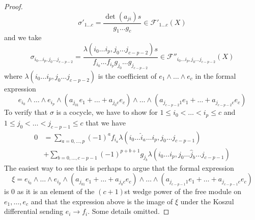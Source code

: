 \documentclass{stacks-project}
\theoremstyle{plain}
\theoremstyle{definition}
\theoremstyle{remark}
\numberwithin{equation}{subsection}
\begin{document}
\begin{proof}
$$\sigma'_{1 \ldots c} = \frac{\det(a_{ji})s}{g_1 \ldots g_c} \in
\mathcal{F}'_{1 \ldots c}(X)
$$
and we take
$$
\sigma_{i_0 \ldots i_p, j_0 \ldots j_{c - p - 2}} =
\frac{\lambda(i_0 \ldots i_p, j_0 \ldots j_{c - p - 2})s}%
{f_{i_0} \ldots f_{i_p}g_{j_0} \ldots g_{j_{c - p - 2}}}
\in \mathcal{F}''_{i_0 \ldots i_p, j_0 \ldots j_{c - p - 2}}(X)
$$
where $\lambda(i_0 \ldots i_p, j_0 \ldots j_{c - p - 2})$
is the coefficient of $e_1 \wedge \ldots \wedge e_c$ in
the formal expression
$$
e_{i_0} \wedge \ldots \wedge e_{i_p} \wedge
(a_{j_01} e_1 + \ldots + a_{j_0c}e_c) \wedge \ldots \wedge
(a_{j_{c - p - 2}1} e_1 + \ldots + a_{j_{c - p - 2}c}e_c)
$$
To verify that $\sigma$ is a cocycle, we have to show for
$1 \leq i_0 < \ldots < i_p \leq c$ and
$1 \leq j_0 < \ldots < j_{c - p - 1} \leq c$
that we have
\begin{align*}
0 & =
\sum\nolimits_{a = 0, \ldots, p} (-1)^a
f_{i_a} \lambda(i_0 \ldots \hat i_a \ldots i_p, j_0 \ldots j_{c - p - 1}) \\
& +
\sum\nolimits_{b = 0, \ldots, c - p - 1} (-1)^{p + b + 1}g_{j_b}
\lambda(i_0 \ldots i_p, j_0 \ldots \hat j_b \ldots j_{c - p - 1})
\end{align*}
The easiest way to see this is perhaps to argue that the formal expression
$$
\xi = e_{i_0} \wedge \ldots \wedge e_{i_p} \wedge
(a_{j_01} e_1 + \ldots + a_{j_0c}e_c) \wedge \ldots \wedge
(a_{j_{c - p - 1}1} e_1 + \ldots + a_{j_{c - p - 1}c}e_c)
$$
is $0$ as it is an element of the $(c + 1)$st wedge power of the free module
on $e_1, \ldots, e_c$ and that the expression above is the image of
$\xi$ under the Koszul differential sending $e_i \to f_i$. Some details
omitted.
\end{proof}
\end{document}
